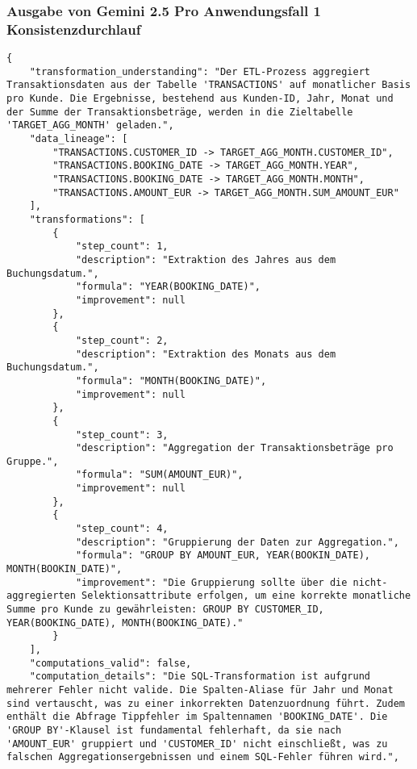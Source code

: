 \subsubsection{Ausgabe von Gemini 2.5 Pro Anwendungsfall 1 Konsistenzdurchlauf}\label{anhang:subsubsec:gemini_case1_prompt2}
\begin{lstlisting}[caption={Ausgabe: Gemini 2.5 Pro Anwendungsfall 1 Konsistenzdurchlauf},label={gemini_case1_prompt2}]
{
    "transformation_understanding": "Der ETL-Prozess aggregiert Transaktionsdaten aus der Tabelle 'TRANSACTIONS' auf monatlicher Basis pro Kunde. Die Ergebnisse, bestehend aus Kunden-ID, Jahr, Monat und der Summe der Transaktionsbeträge, werden in die Zieltabelle 'TARGET_AGG_MONTH' geladen.",
    "data_lineage": [
        "TRANSACTIONS.CUSTOMER_ID -> TARGET_AGG_MONTH.CUSTOMER_ID",
        "TRANSACTIONS.BOOKING_DATE -> TARGET_AGG_MONTH.YEAR",
        "TRANSACTIONS.BOOKING_DATE -> TARGET_AGG_MONTH.MONTH",
        "TRANSACTIONS.AMOUNT_EUR -> TARGET_AGG_MONTH.SUM_AMOUNT_EUR"
    ],
    "transformations": [
        {
            "step_count": 1,
            "description": "Extraktion des Jahres aus dem Buchungsdatum.",
            "formula": "YEAR(BOOKING_DATE)",
            "improvement": null
        },
        {
            "step_count": 2,
            "description": "Extraktion des Monats aus dem Buchungsdatum.",
            "formula": "MONTH(BOOKING_DATE)",
            "improvement": null
        },
        {
            "step_count": 3,
            "description": "Aggregation der Transaktionsbeträge pro Gruppe.",
            "formula": "SUM(AMOUNT_EUR)",
            "improvement": null
        },
        {
            "step_count": 4,
            "description": "Gruppierung der Daten zur Aggregation.",
            "formula": "GROUP BY AMOUNT_EUR, YEAR(BOOKIN_DATE), MONTH(BOOKIN_DATE)",
            "improvement": "Die Gruppierung sollte über die nicht-aggregierten Selektionsattribute erfolgen, um eine korrekte monatliche Summe pro Kunde zu gewährleisten: GROUP BY CUSTOMER_ID, YEAR(BOOKING_DATE), MONTH(BOOKING_DATE)."
        }
    ],
    "computations_valid": false,
    "computation_details": "Die SQL-Transformation ist aufgrund mehrerer Fehler nicht valide. Die Spalten-Aliase für Jahr und Monat sind vertauscht, was zu einer inkorrekten Datenzuordnung führt. Zudem enthält die Abfrage Tippfehler im Spaltennamen 'BOOKING_DATE'. Die 'GROUP BY'-Klausel ist fundamental fehlerhaft, da sie nach 'AMOUNT_EUR' gruppiert und 'CUSTOMER_ID' nicht einschließt, was zu falschen Aggregationsergebnissen und einem SQL-Fehler führen wird.",

\end{lstlisting}
